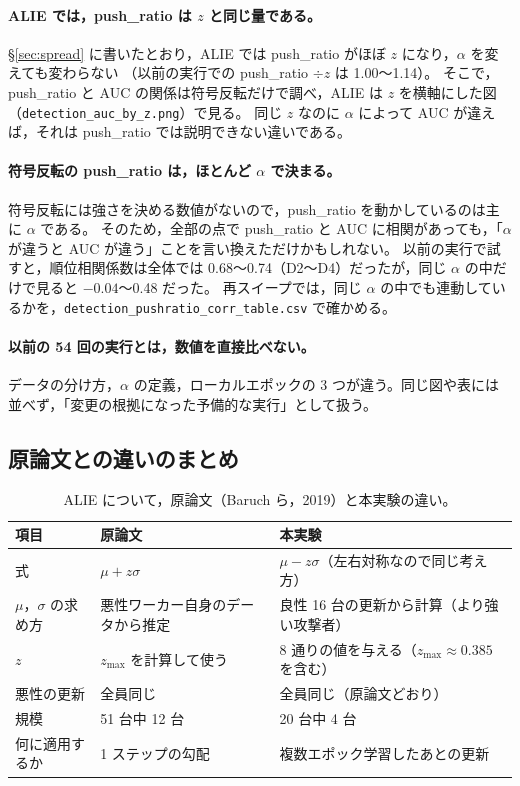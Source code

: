 \documentclass[a4j, dvipdfmx]{jsarticle}  %
\begin{document}
\paragraph{ALIE では，push\_ratio は $z$ と同じ量である。}
\S\ref{sec:spread} に書いたとおり，ALIE では push\_ratio がほぼ $z$ になり，$\alpha$ を変えても変わらない
（以前の実行での push\_ratio $\div z$ は 1.00〜1.14）。
そこで，push\_ratio と AUC の関係は符号反転だけで調べ，ALIE は $z$ を横軸にした図（\texttt{detection\_auc\_by\_z.png}）で見る。
同じ $z$ なのに $\alpha$ によって AUC が違えば，それは push\_ratio では説明できない違いである。

\paragraph{符号反転の push\_ratio は，ほとんど $\alpha$ で決まる。}
符号反転には強さを決める数値がないので，push\_ratio を動かしているのは主に $\alpha$ である。
そのため，全部の点で push\_ratio と AUC に相関があっても，「$\alpha$ が違うと AUC が違う」ことを言い換えただけかもしれない。
以前の実行で試すと，順位相関係数は全体では 0.68〜0.74（D2〜D4）だったが，同じ $\alpha$ の中だけで見ると $-0.04$〜0.48 だった。
再スイープでは，同じ $\alpha$ の中でも連動しているかを，\texttt{detection\_pushratio\_corr\_table.csv} で確かめる。

\paragraph{以前の 54 回の実行とは，数値を直接比べない。}
データの分け方，$\alpha$ の定義，ローカルエポックの 3 つが違う。同じ図や表には並べず，「変更の根拠になった予備的な実行」として扱う。

\subsection{原論文との違いのまとめ}

\begin{table}[H]
\centering
\caption{ALIE について，原論文（Baruch ら，2019）と本実験の違い。}
\begin{tabular}{@{}P{3.6cm} P{5.4cm} P{6.3cm}@{}}
\toprule
項目 & 原論文 & 本実験 \\
\midrule
式 & $\mu + z\sigma$ & $\mu - z\sigma$（左右対称なので同じ考え方） \\
$\mu$，$\sigma$ の求め方 & 悪性ワーカー自身のデータから推定 & 良性 16 台の更新から計算（より強い攻撃者） \\
$z$ & $z_{\max}$ を計算して使う & 8 通りの値を与える（$z_{\max} \approx 0.385$ を含む） \\
悪性の更新 & 全員同じ & 全員同じ（原論文どおり） \\
規模 & 51 台中 12 台 & 20 台中 4 台 \\
何に適用するか & 1 ステップの勾配 & 複数エポック学習したあとの更新 \\
\bottomrule
\end{tabular}
\end{table}
\end{document}

